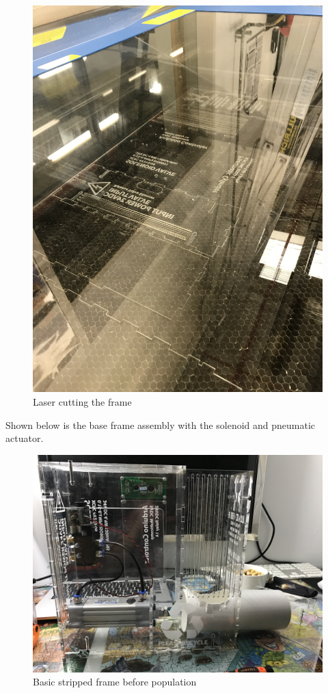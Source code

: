 \documentclass[a4paper, 10pt]{IEEEconf}
\begin{document}
\begin{figure}[H]
  \includegraphics[width=\linewidth]{images/laser}
  \caption{Laser cutting the frame}
  \label{fig:Laser cutting the frame}
\end{figure}

Shown below is the base frame assembly with the solenoid and pneumatic actuator.

\begin{figure}[H]
  \includegraphics[width=\linewidth]{images/Frame}
  \caption{Basic stripped frame before population}
  \label{fig:Basic stripped frame before population}
\end{figure}
\end{document}
